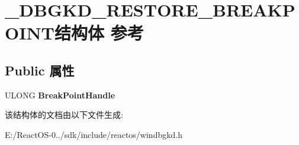 \hypertarget{struct___d_b_g_k_d___r_e_s_t_o_r_e___b_r_e_a_k_p_o_i_n_t}{}\section{\+\_\+\+D\+B\+G\+K\+D\+\_\+\+R\+E\+S\+T\+O\+R\+E\+\_\+\+B\+R\+E\+A\+K\+P\+O\+I\+N\+T结构体 参考}
\label{struct___d_b_g_k_d___r_e_s_t_o_r_e___b_r_e_a_k_p_o_i_n_t}
\subsection*{Public 属性}
\begin{DoxyCompactItemize}
\item 
\mbox{\label{struct___d_b_g_k_d___r_e_s_t_o_r_e___b_r_e_a_k_p_o_i_n_t_a074b63cb0477dc595bb9bc8e003cf032}} 
U\+L\+O\+NG {\bfseries Break\+Point\+Handle}
\end{DoxyCompactItemize}


该结构体的文档由以下文件生成\+:\begin{DoxyCompactItemize}
\item 
E\+:/\+React\+O\+S-\/0../sdk/include/reactos/windbgkd.\+h\end{DoxyCompactItemize}
